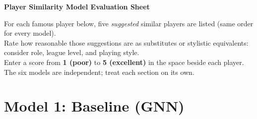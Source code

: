 \documentclass[11pt]{article}
\begin{document}
\begin{center}
    {\LARGE\bfseries Player Similarity Model Evaluation Sheet}

    \vspace{0.4em}
    {\normalsize For each famous player below, five \emph{suggested} similar players are listed (same order for every model).}\\
    {\normalsize Rate how reasonable those suggestions are as substitutes or stylistic equivalents: consider role, league level, and playing style.}\\
    {\normalsize Enter a score from \textbf{1 (poor)} to \textbf{5 (excellent)} in the space beside each player.}\\
    {\normalsize The six models are independent; treat each section on its own.}
\end{center}

\vspace{0.6em}

\section*{Model 1: Baseline (GNN)}
\end{document}
